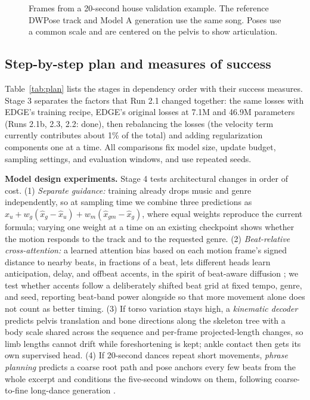 \documentclass[conference,letterpaper]{IEEEtran}
\begin{document}
\begin{figure}[t]
\caption{Frames from a 20-second house validation example. The reference DWPose track and Model A generation use the same song. Poses use a common scale and are centered on the pelvis to show articulation.}
\label{fig:pose}
\end{figure}

\subsection{Step-by-step plan and measures of success}
Table~\ref{tab:plan} lists the stages in dependency order with their success measures. Stage 3 separates the factors that Run 2.1 changed together: the same losses with EDGE's training recipe, EDGE's original losses at 7.1M and 46.9M parameters (Runs 2.1b, 2.3, 2.2: done), then rebalancing the losses (the velocity term currently contributes about 1\% of the total) and adding regularization components one at a time. All comparisons fix model size, update budget, sampling settings, and evaluation windows, and use repeated seeds.

\textbf{Model design experiments.} Stage 4 tests architectural changes in order of cost. (1) \emph{Separate guidance:} training already drops music and genre independently, so at sampling time we combine three predictions as $\hat{x}_u + w_g(\hat{x}_g - \hat{x}_u) + w_m(\hat{x}_{gm} - \hat{x}_g)$, where equal weights reproduce the current formula; varying one weight at a time on an existing checkpoint shows whether the motion responds to the track and to the requested genre. (2) \emph{Beat-relative cross-attention:} a learned attention bias based on each motion frame's signed distance to nearby beats, in fractions of a beat, lets different heads learn anticipation, delay, and offbeat accents, in the spirit of beat-aware diffusion \cite{gao2026}; we test whether accents follow a deliberately shifted beat grid at fixed tempo, genre, and seed, reporting beat-band power alongside so that more movement alone does not count as better timing. (3) If torso variation stays high, a \emph{kinematic decoder} predicts pelvis translation and bone directions along the skeleton tree with a body scale shared across the sequence and per-frame projected-length changes, so limb lengths cannot drift while foreshortening is kept; ankle contact then gets its own supervised head. (4) If 20-second dances repeat short movements, \emph{phrase planning} predicts a coarse root path and pose anchors every few beats from the whole excerpt and conditions the five-second windows on them, following coarse-to-fine long-dance generation \cite{lodge2024}.
\end{document}
